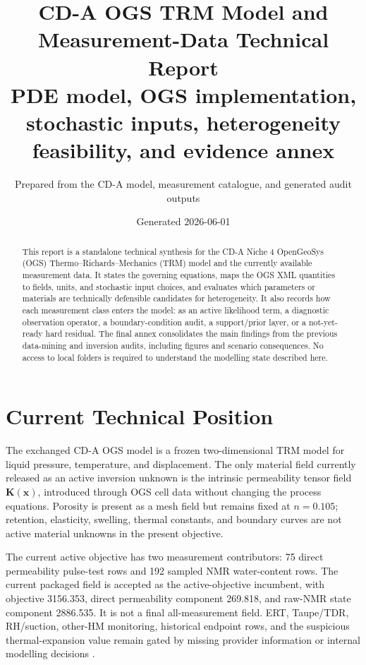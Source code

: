 \documentclass[10pt,a4paper]{article}
\title{\textbf{CD-A OGS TRM Model and Measurement-Data Technical Report}\\
\large PDE model, OGS implementation, stochastic inputs, heterogeneity feasibility, and evidence annex}
\author{Prepared from the CD-A model, measurement catalogue, and generated audit outputs}
\date{Generated 2026-06-01}
\newcommand{\code}[1]{\texttt{\detokenize{#1}}}
\newcommand{\npor}{n}
\newcommand{\K}{\bm K}
\begin{document}
\maketitle

\begin{abstract}
This report is a standalone technical synthesis for the CD-A Niche 4 OpenGeoSys
(OGS) Thermo--Richards--Mechanics (TRM) model and the currently available
measurement data.  It states the governing equations, maps the OGS XML quantities
to fields, units, and stochastic input choices, and evaluates which parameters or
materials are technically defensible candidates for heterogeneity.  It also records
how each measurement class enters the model: as an active likelihood term, a
diagnostic observation operator, a boundary-condition audit, a support/prior layer,
or a not-yet-ready hard residual.  The final annex consolidates the main findings
from the previous data-mining and inversion audits, including figures and scenario
consequences.  No access to local folders is required to understand the modelling
state described here.
\end{abstract}

\section*{Current Technical Position}

The exchanged CD-A OGS model is a frozen two-dimensional TRM model for liquid
pressure, temperature, and displacement.  The only material field currently released
as an active inversion unknown is the intrinsic permeability tensor field
\(\K(\bm x)\), introduced through OGS \code{MeshElement} cell data without changing
the process equations.  Porosity is present as a mesh field but remains fixed at
\(\npor=0.105\); retention, elasticity, swelling, thermal constants, and boundary
curves are not active material unknowns in the present objective.

The current active objective has two measurement contributors: 75 direct
permeability pulse-test rows and 192 sampled NMR water-content rows.  The current
packaged field is accepted as the active-objective incumbent, with objective
3156.353, direct permeability component 269.818, and raw-NMR state component
2886.535.  It is not a final all-measurement field.  ERT, Taupe/TDR, RH/suction,
other-HM monitoring, historical endpoint rows, and the suspicious thermal-expansion
\code{CTE} value remain gated by missing provider information or internal modelling
decisions \citep{GeneratedAuditSuite2026}.
\end{document}
